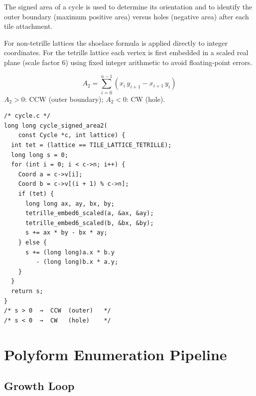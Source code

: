 \documentclass[10pt,a4paper]{article}
\newcommand{\file}[1]{\texttt{\footnotesize #1}}
\begin{document}
\begin{tcolorbox}[dualbox, title=Shoelace Formula — \file{src/core/cycle.c}]
  The signed area of a cycle is used to determine its orientation and
  to identify the outer boundary (maximum positive area) versus holes
  (negative area) after each tile attachment.

  For non-tetrille lattices the shoelace formula is applied directly
  to integer coordinates.  For the tetrille lattice each vertex is
  first embedded in a scaled real plane (scale factor 6) using fixed
  integer arithmetic to avoid floating-point errors.

  \[
    A_2 = \sum_{i=0}^{n-1} (x_i \, y_{i+1} - x_{i+1} \, y_i)
  \]
  $A_2 > 0$: CCW (outer boundary); \;
  $A_2 < 0$: CW (hole).
\tcblower
\begin{verbatim}
/* cycle.c */
long long cycle_signed_area2(
    const Cycle *c, int lattice) {
  int tet = (lattice == TILE_LATTICE_TETRILLE);
  long long s = 0;
  for (int i = 0; i < c->n; i++) {
    Coord a = c->v[i];
    Coord b = c->v[(i + 1) % c->n];
    if (tet) {
      long long ax, ay, bx, by;
      tetrille_embed6_scaled(a, &ax, &ay);
      tetrille_embed6_scaled(b, &bx, &by);
      s += ax * by - bx * ay;
    } else {
      s += (long long)a.x * b.y
         - (long long)b.x * a.y;
    }
  }
  return s;
}
/* s > 0  →  CCW  (outer)   */
/* s < 0  →  CW   (hole)    */
\end{verbatim}
\end{tcolorbox}

\section{Polyform Enumeration Pipeline}

\subsection{Growth Loop}
\end{document}

